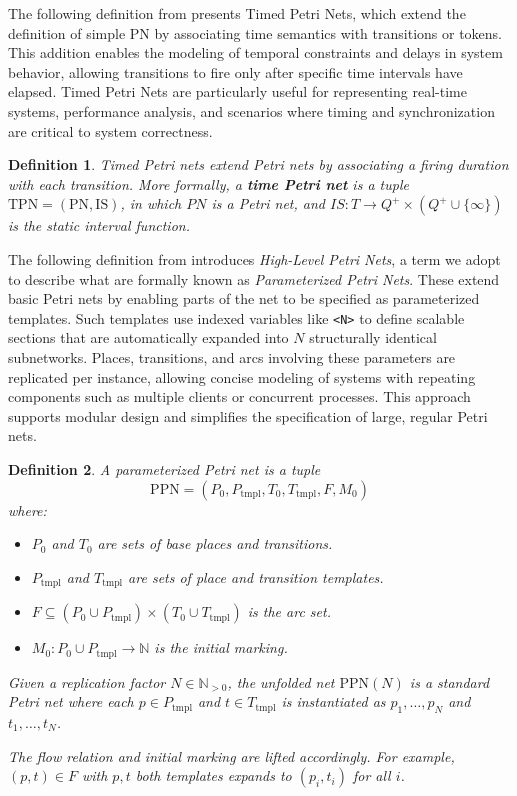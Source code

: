 \documentclass[12pt]{article}
\newtheorem{definition}{Definition}
\begin{document}
    The following definition from \cite{diaz2013petri} presents Timed Petri Nets, which extend the definition of simple PN by associating time semantics with transitions or tokens. This addition enables the modeling of temporal constraints and delays in system behavior, allowing transitions to fire only after specific time intervals have elapsed. Timed Petri Nets are particularly useful for representing real-time systems, performance analysis, and scenarios where timing and synchronization are critical to system correctness.
    \begin{definition}
        Timed Petri nets extend Petri nets by associating a firing duration with each transition. More formally, a \textbf{time Petri net} is a tuple $\mathrm{TPN}=(\mathrm{PN},\mathrm{IS})$, in which $PN$ is a Petri net, and $IS:T\rightarrow Q^+ \times (Q^+ \cup \{\infty\})$ is the static interval function. 
    \end{definition}
        
    The following definition from \cite{diaz2013petri} introduces \emph{High-Level Petri Nets}, a term we adopt to describe what are formally known as \emph{Parameterized Petri Nets}. These extend basic Petri nets by enabling parts of the net to be specified as parameterized templates. Such templates use indexed variables like \texttt{<N>} to define scalable sections that are automatically expanded into $N$ structurally identical subnetworks. Places, transitions, and arcs involving these parameters are replicated per instance, allowing concise modeling of systems with repeating components such as multiple clients or concurrent processes. This approach supports modular design and simplifies the specification of large, regular Petri nets.
    \begin{definition}
        A \emph{parameterized Petri net} is a tuple
\[
\mathrm{PPN} = (P_0, P_{\mathrm{tmpl}}, T_0, T_{\mathrm{tmpl}}, F, M_0)
\]
where:
\begin{itemize}
    \item $P_0$ and $T_0$ are sets of base places and transitions.
    \item $P_{\mathrm{tmpl}}$ and $T_{\mathrm{tmpl}}$ are sets of place and transition templates.
    \item $F \subseteq (P_0 \cup P_{\mathrm{tmpl}}) \times (T_0 \cup T_{\mathrm{tmpl}})$ is the arc set.
    \item $M_0 : P_0 \cup P_{\mathrm{tmpl}} \to \mathbb{N}$ is the initial marking.
\end{itemize}

Given a replication factor $N \in \mathbb{N}_{>0}$, the unfolded net $\mathrm{PPN}(N)$ is a standard Petri net where each $p \in P_{\mathrm{tmpl}}$ and $t \in T_{\mathrm{tmpl}}$ is instantiated as $p_1, \dots, p_N$ and $t_1, \dots, t_N$.

The flow relation and initial marking are lifted accordingly. For example, $(p, t) \in F$ with $p, t$ both templates expands to $(p_i, t_i)$ for all $i$.

    \end{definition}
\end{document}
